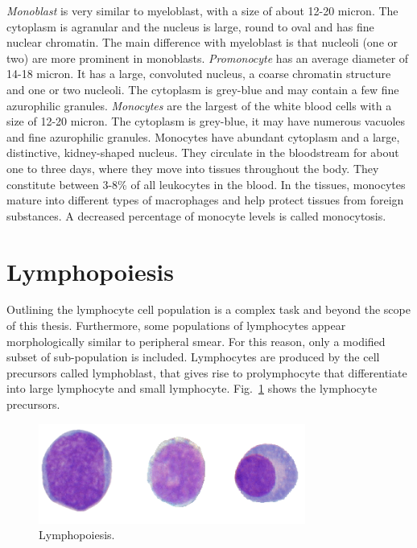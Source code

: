 \documentclass[final,a4paper,12pt,english]{UnicaPhdThesis3}
\begin{document}
{\textit{Monoblast} is very similar to myeloblast, with a size of about 12-20 micron. The cytoplasm is agranular and the nucleus is large, round to oval and has fine nuclear chromatin. The main difference with myeloblast is that nucleoli (one or two) are more prominent in monoblasts. \textit{Promonocyte} has an average diameter of 14-18 micron. It has a large, convoluted nucleus, a coarse chromatin structure and one or two nucleoli. The cytoplasm is grey-blue and may contain a few fine azurophilic granules. \textit{Monocytes} are the largest of the white blood cells with a size of 12-20 micron. The cytoplasm is grey-blue, it may have numerous vacuoles and fine azurophilic granules. Monocytes have abundant cytoplasm and a large, distinctive, kidney-shaped nucleus. They circulate in the bloodstream for about one to three days, where they move into tissues throughout the body. They constitute between 3-8\% of all leukocytes in the blood. In the tissues, monocytes mature into different types of macrophages and help protect tissues from foreign substances. A decreased percentage of monocyte levels is called monocytosis.

\section{Lymphopoiesis}
Outlining the lymphocyte cell population is a complex task and beyond the scope of this thesis. Furthermore, some populations of lymphocytes appear morphologically similar to peripheral smear. For this reason, only a modified subset of sub-population is included. Lymphocytes are produced by the cell precursors called lymphoblast, that gives rise to prolymphocyte that differentiate into large lymphocyte and small lymphocyte.
Fig.~\ref{fig:Lymphopoiesis} shows the lymphocyte precursors.

\begin{figure}[!htbp]
\centering
\includegraphics[width=0.78\textwidth]{images/lymphopoiesis}
\caption{\label{fig:Lymphopoiesis} Lymphopoiesis.}
\end{figure}

}
\end{document}
